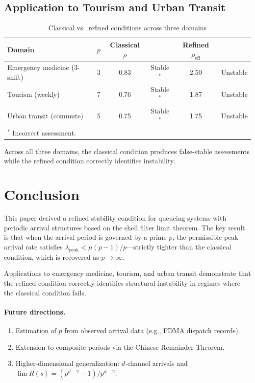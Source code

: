 \documentclass[12pt]{article}
\newcommand{\rhoeff}{\rho_{\mathrm{eff}}}
\newcommand{\lpeak}{\lambda_{\mathrm{peak}}}
\begin{document}
\subsection{Application to Tourism and Urban Transit}

\begin{table}[h]
\centering
\caption{Classical vs.\ refined conditions across three domains}
\label{tab:comparison}
\begin{tabular}{lccccc}
\toprule
Domain & $p$ & Classical $\rho$ & & Refined $\rhoeff$ & \\
\midrule
Emergency medicine (3-shift) & 3 & 0.83 & Stable$^*$ & 2.50 & Unstable \\
Tourism (weekly)              & 7 & 0.76 & Stable$^*$ & 1.87 & Unstable \\
Urban transit (commute)       & 5 & 0.75 & Stable$^*$ & 1.75 & Unstable \\
\bottomrule
\multicolumn{6}{l}{$^*$ Incorrect assessment.}
\end{tabular}
\end{table}

Across all three domains, the classical condition produces false-stable 
assessments while the refined condition correctly identifies instability.

\section{Conclusion}

This paper derived a refined stability condition for queueing systems 
with periodic arrival structures based on the shell filter limit theorem.
The key result is that when the arrival period is governed by a prime $p$,
the permissible peak arrival rate satisfies $\lpeak < \mu(p-1)/p$---strictly
tighter than the classical condition, which is recovered as $p \to \infty$.

Applications to emergency medicine, tourism, and urban transit demonstrate 
that the refined condition correctly identifies structural instability in 
regimes where the classical condition fails.

\paragraph{Future directions.}
\begin{enumerate}
  \item Estimation of $p$ from observed arrival data (e.g., FDMA dispatch records).
  \item Extension to composite periods via the Chinese Remainder Theorem.
  \item Higher-dimensional generalization: $d$-channel arrivals and 
    $\lim R(s) = (p^{d-2}-1)/p^{d-2}$.
\end{enumerate}
\end{document}
